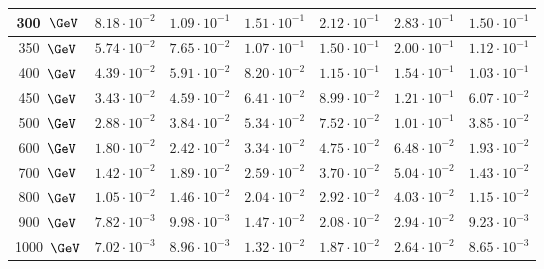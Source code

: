 \begin{table}[!h]
\begin{center}
{\begin{tabular}{|c|c|c|c|c|c|c|}
\hline
               300~$\GeV$ &               $8.18 \cdot 10^{-2}$ &               $1.09 \cdot 10^{-1}$ &               $1.51 \cdot 10^{-1}$ &               $2.12 \cdot 10^{-1}$ &               $2.83 \cdot 10^{-1}$ &               $1.50 \cdot 10^{-1}$  \\
\hline
               350~$\GeV$ &               $5.74 \cdot 10^{-2}$ &               $7.65 \cdot 10^{-2}$ &               $1.07 \cdot 10^{-1}$ &               $1.50 \cdot 10^{-1}$ &               $2.00 \cdot 10^{-1}$ &               $1.12 \cdot 10^{-1}$  \\
\hline
               400~$\GeV$ &               $4.39 \cdot 10^{-2}$ &               $5.91 \cdot 10^{-2}$ &               $8.20 \cdot 10^{-2}$ &               $1.15 \cdot 10^{-1}$ &               $1.54 \cdot 10^{-1}$ &               $1.03 \cdot 10^{-1}$  \\
\hline
               450~$\GeV$ &               $3.43 \cdot 10^{-2}$ &               $4.59 \cdot 10^{-2}$ &               $6.41 \cdot 10^{-2}$ &               $8.99 \cdot 10^{-2}$ &               $1.21 \cdot 10^{-1}$ &               $6.07 \cdot 10^{-2}$  \\
\hline
               500~$\GeV$ &               $2.88 \cdot 10^{-2}$ &               $3.84 \cdot 10^{-2}$ &               $5.34 \cdot 10^{-2}$ &               $7.52 \cdot 10^{-2}$ &               $1.01 \cdot 10^{-1}$ &               $3.85 \cdot 10^{-2}$  \\
\hline
               600~$\GeV$ &               $1.80 \cdot 10^{-2}$ &               $2.42 \cdot 10^{-2}$ &               $3.34 \cdot 10^{-2}$ &               $4.75 \cdot 10^{-2}$ &               $6.48 \cdot 10^{-2}$ &               $1.93 \cdot 10^{-2}$  \\
\hline
               700~$\GeV$ &               $1.42 \cdot 10^{-2}$ &               $1.89 \cdot 10^{-2}$ &               $2.59 \cdot 10^{-2}$ &               $3.70 \cdot 10^{-2}$ &               $5.04 \cdot 10^{-2}$ &               $1.43 \cdot 10^{-2}$  \\
\hline
               800~$\GeV$ &               $1.05 \cdot 10^{-2}$ &               $1.46 \cdot 10^{-2}$ &               $2.04 \cdot 10^{-2}$ &               $2.92 \cdot 10^{-2}$ &               $4.03 \cdot 10^{-2}$ &               $1.15 \cdot 10^{-2}$  \\
\hline
               900~$\GeV$ &               $7.82 \cdot 10^{-3}$ &               $9.98 \cdot 10^{-3}$ &               $1.47 \cdot 10^{-2}$ &               $2.08 \cdot 10^{-2}$ &               $2.94 \cdot 10^{-2}$ &               $9.23 \cdot 10^{-3}$  \\
\hline
              1000~$\GeV$ &               $7.02 \cdot 10^{-3}$ &               $8.96 \cdot 10^{-3}$ &               $1.32 \cdot 10^{-2}$ &               $1.87 \cdot 10^{-2}$ &               $2.64 \cdot 10^{-2}$ &               $8.65 \cdot 10^{-3}$  \\
\hline
 \end{tabular}
} %
    \label{ggH-limit}
  \end{center}
\end{table}

